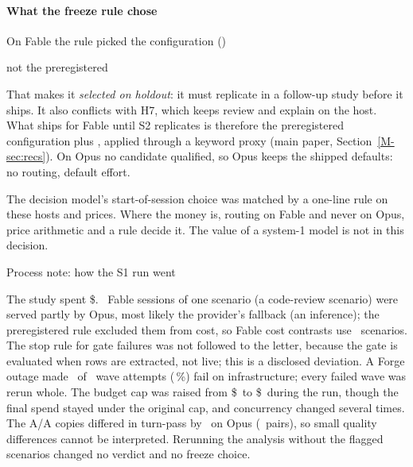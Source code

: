 \paragraph{What the freeze rule chose} On Fable the rule picked the configuration (\SFreezeFableRatio\X)
\begin{center}\small\code{\SFreezeFable}\end{center}
not the preregistered
\begin{center}\small\code{\SFreezeFablePrereg}\end{center} That makes it \emph{selected on holdout}: it must replicate in a follow-up study before it
ships. It also conflicts with H7, which keeps review and explain on the host. What ships for Fable until S2 replicates is
therefore the preregistered configuration plus , applied through a keyword proxy
(main paper, Section~\ref{M-sec:recs}). On Opus no candidate qualified, so
Opus keeps the shipped defaults: no routing, default effort.

\begin{keyidea}
The decision model's start-of-session choice was matched by a one-line rule on these hosts and prices. Where the money
is, routing on Fable and never on Opus, price arithmetic and a rule decide it. The value of a system-1 model is not in
this decision.
\end{keyidea}

\begin{processnote}{Process note: how the S1 run went}
\raggedright The study spent \$\SSpend. \SGateFail\ Fable sessions of one scenario
(a code-review scenario) were served partly by Opus, most likely the provider's fallback (an inference); the preregistered rule
excluded them from cost, so Fable cost contrasts use \SHOneN\ scenarios. The stop rule for gate failures was not followed
to the letter, because the gate is evaluated when rows are extracted, not live; this is a disclosed deviation. A Forge
outage made \SInfraAttempts\ of \SAttempts\ wave attempts (\SInfraPct\,\%) fail on infrastructure; every failed wave was
rerun whole. The budget cap was raised from \$\SBudgetOrig\ to \$\SBudgetFinal\ during the run, though the final spend
stayed under the original cap, and concurrency changed several times. The A/A copies differed in turn-pass by
\SNoiseOpusDtp\ on Opus (\SNoiseN\ pairs), so small quality differences cannot be interpreted. Rerunning the analysis
without the flagged scenarios changed no verdict and no freeze choice.
\end{processnote}


